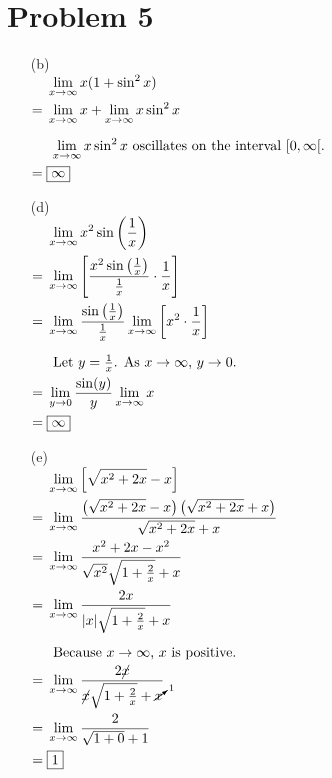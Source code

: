 \documentclass{article}
\newcommand{\alignedintertext}[1]{%
  \noalign{%
    \vskip\belowdisplayshortskip
    \vtop{\hsize=\linewidth#1\par
    \expandafter}%
    \expandafter\prevdepth\the\prevdepth
  }%
}
\newcommand*{\paren}[1]{\ensuremath\left(#1\right)}
\newcommand*{\problem}[1]{\section*{Problem #1}}
\newcommand*{\limit}[2][x]{\ensuremath{\displaystyle\lim_{#1\to#2}}}
\newcommand*{\Limit}[3][x]{\ensuremath{\displaystyle\lim_{#1\to#2}\left[#3\right]}}
\begin{document}
\pagebreak
\problem{5}
\begin{multicols}{2}
\begin{itemize}
	\item[(b)]
	$\begin{aligned}[t]
		&\limit{\infty}x(1+\sin^2x) \\
		={}&\limit{\infty}x+\limit{\infty}x\sin^2x \\
		\alignedintertext{$\limit{\infty}x\sin^2x$ oscillates on the interval $\interval[open right]{0}{\infty}$.}
		={}&\boxed{\infty}
	\end{aligned}$

	\item[(d)]
	$\begin{aligned}[t]
		&\limit{\infty}x^2\sin\paren{\frac{1}{x}} \\
		={}&\Limit{\infty}{\frac{x^2\sin\paren{\frac{1}{x}}}{\frac{1}{x}}\cdot\frac{1}{x}} \\
		={}&\limit{\infty}\frac{\sin\paren{\frac{1}{x}}}{\frac{1}{x}}\Limit{\infty}{x^2\cdot\frac{1}{x}} \\
		\alignedintertext{Let $y=\frac{1}{x}$. As $x\to\infty$, $y\to0$.}
		={}&\limit[y]{0}\frac{\sin(y)}{y}\limit{\infty}x \\
		={}&\boxed{\infty}
	\end{aligned}$

	\item[(e)]
	$\begin{aligned}[t]
		&\Limit{\infty}{\sqrt{x^2+2x}-x} \\
		={}&\limit{\infty}\frac{\paren{\sqrt{x^2+2x}-x}\paren{\sqrt{x^2+2x}+x}}{\sqrt{x^2+2x}+x} \\
		={}&\limit{\infty}\frac{x^2+2x-x^2}{\sqrt{x^2}\sqrt{1+\frac{2}{x}}+x} \\
		={}&\limit{\infty}\frac{2x}{|x|\sqrt{1+\frac{2}{x}}+x} \\
		\alignedintertext{Because $x\to\infty$, $x$ is positive.}
		={}&\limit{\infty}\frac{2\cancel{x}}{\cancel{x}\sqrt{1+\frac{2}{x}}+\cancelto{1}{x}} \\
		={}&\limit{\infty}\frac{2}{\sqrt{1+0}+1} \\
		={}&\boxed{1}
	\end{aligned}$


\end{itemize}
\end{multicols}
\end{document}

